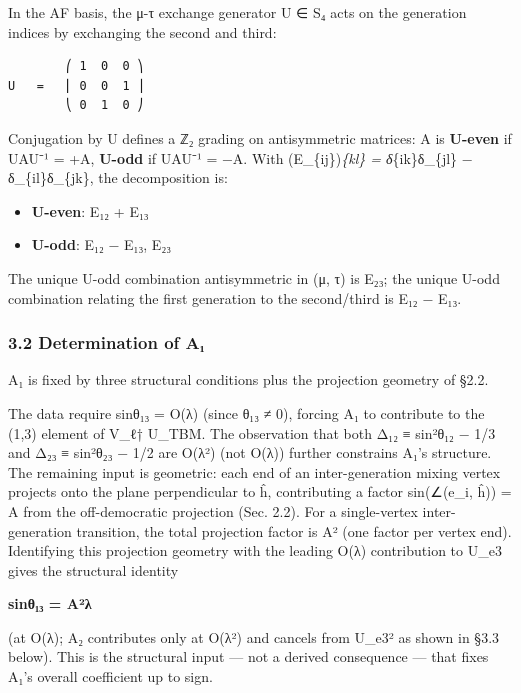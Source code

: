 \documentclass[
  11pt,
  letterpaper,
]{article}
\providecommand{\tightlist}{%
  \setlength{\itemsep}{0pt}\setlength{\parskip}{0pt}}
\begin{document}
In the AF basis, the μ-τ exchange generator U ∈ S₄ acts on the
generation indices by exchanging the second and third:

\begin{verbatim}
        ⎛ 1  0  0 ⎞
U   =   ⎜ 0  0  1 ⎟
        ⎝ 0  1  0 ⎠
\end{verbatim}

Conjugation by U defines a ℤ₂ grading on antisymmetric matrices: A is
\textbf{U-even} if UAU⁻¹ = +A, \textbf{U-odd} if UAU⁻¹ = −A. With
(E\_\{ij\})\emph{\{kl\} = δ}\{ik\}δ\_\{jl\} − δ\_\{il\}δ\_\{jk\}, the
decomposition is:

\begin{itemize}
\tightlist
\item
  \textbf{U-even}: E₁₂ + E₁₃
\item
  \textbf{U-odd}: E₁₂ − E₁₃, E₂₃
\end{itemize}

The unique U-odd combination antisymmetric in (μ, τ) is E₂₃; the unique
U-odd combination relating the first generation to the second/third is
E₁₂ − E₁₃.

\hypertarget{determination-of-aux2081}{%
\subsubsection{3.2 Determination of A₁}\label{determination-of-aux2081}}

A₁ is fixed by three structural conditions plus the projection geometry
of §2.2.

The data require sinθ₁₃ = O(λ) (since θ₁₃ ≠ 0), forcing A₁ to contribute
to the (1,3) element of V\_ℓ† U\_TBM. The observation that both Δ₁₂ ≡
sin²θ₁₂ − 1/3 and Δ₂₃ ≡ sin²θ₂₃ − 1/2 are O(λ²) (not O(λ)) further
constrains A₁'s structure. The remaining input is geometric: each end of
an inter-generation mixing vertex projects onto the plane perpendicular
to ĥ, contributing a factor sin(∠(e\_i, ĥ)) = A from the off-democratic
projection (Sec. 2.2). For a single-vertex inter-generation transition,
the total projection factor is A² (one factor per vertex end).
Identifying this projection geometry with the leading O(λ) contribution
to U\_e3 gives the structural identity

\textbf{sinθ₁₃ = A²λ}

(at O(λ); A₂ contributes only at O(λ²) and cancels from
\textbar U\_e3\textbar² as shown in §3.3 below). This is the structural
input --- not a derived consequence --- that fixes A₁'s overall
coefficient up to sign.
\end{document}
